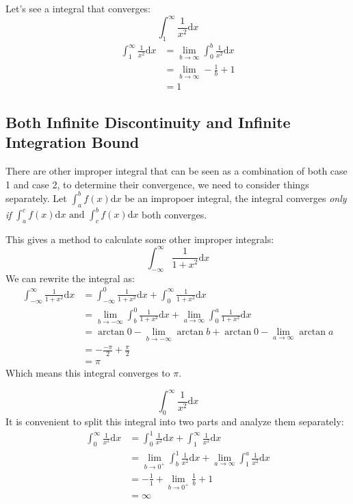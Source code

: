 \documentclass{article}
\begin{document}
Let's see a integral that converges:
\[
    \int_{1}^{\infty} \frac{1}{x^2}\mathrm{d}x
\]
\[
    \begin{split}
        \int_{1}^{\infty} \frac{1}{x^2}\mathrm{d}x & = \lim_{b\to \infty} \int_{0}^{b}\frac{1}{x^2}\mathrm{d}x\\
        & = \lim_{b\to \infty} -\frac{1}{b} + 1 \\
        & = 1
    \end{split}
\]

\subsection{Both Infinite Discontinuity and Infinite Integration Bound}
There are other improper integral that can be seen as a combination of both case 1 and case 2, to determine their convergence, we need to consider things separately.
Let $\displaystyle \int_{a}^{b} f(x)\mathrm{d}x$ be an impropoer integral, the integral converges \emph{only if} $\displaystyle \int_{a}^{c} f(x)\mathrm{d}x \text{ and } \int_{c}^{b} f(x)\mathrm{d}x$ both converges.

This gives a method to calculate some other improper integrals:
\[
    \int_{-\infty}^{\infty} \frac{1}{1+x^2}\mathrm{d}x
\]
We can rewrite the integral as:
\[
    \begin{split}
        \int_{-\infty}^{\infty} \frac{1}{1+x^2}\mathrm{d}x & = \int_{-\infty}^{0} \frac{1}{1+x^2}\mathrm{d}x + \int_{0}^{\infty} \frac{1}{1+x^2} \mathrm{d}x \\
        & = \lim_{b\to -\infty} \int_{b}^{0} \frac{1}{1+x^2}\mathrm{d}x + \lim_{a\to \infty} \int_{0}^{a}\frac{1}{1+x^2}\mathrm{d}x\\
        & = \arctan 0 - \lim_{b\to -\infty} \arctan b + \arctan 0 - \lim_{a\to \infty} \arctan a \\
        & = -\frac{-\pi}{2} + \frac{\pi}{2} \\
        & = \pi
    \end{split}
\]
Which means this integral converges to $\pi$.

\[
    \int_{0}^{\infty} \frac{1}{x^2}\mathrm{d}x
\]
It is convenient to split this integral into two parts and analyze them separately:
\[
    \begin{split}
        \int_{0}^{\infty} \frac{1}{x^2}\mathrm{d}x &= \int_{0}^{1}\frac{1}{x^2}\mathrm{d}x + \int_{1}^{\infty}\frac{1}{x^2} \mathrm{d}x\\
        & = \lim_{b\to 0^+} \int_{b}^{1} \frac{1}{x^2}\mathrm{d}x + \lim_{a\to \infty} \int_{1}^{a} \frac{1}{x^2} \mathrm{d}x \\
        & = -\frac{1}{1} + \lim_{b\to 0^+} \frac{1}{b} + 1\\
        & = \infty
    \end{split}
\]
\end{document}
